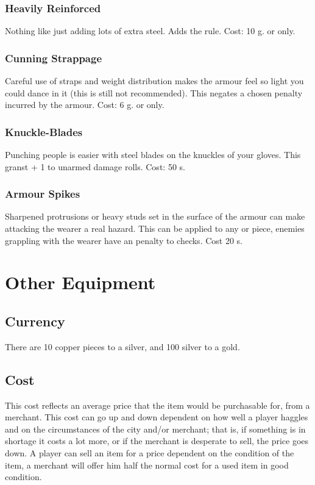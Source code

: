 \subsection{Heavily Reinforced}
Nothing like just adding lots of extra steel. Adds the  rule. Cost: 10 g.  or  only.

\subsection{Cunning Strappage}
Careful use of straps and weight distribution makes the armour feel so light you could dance in it (this is still not recommended). This negates a chosen  penalty incurred by the armour. Cost: 6 g.  or  only.

\subsection{Knuckle-Blades}
Punching people is easier with steel blades on the knuckles of your gloves. This granst + 1  to unarmed damage rolls. Cost: 50 s.

\subsection{Armour Spikes}
Sharpened protrusions or heavy studs set in the surface of the armour can make attacking the wearer a real hazard. This can be applied to any  or  piece, enemies grappling with the wearer have an  penalty to  checks. Cost 20 s.



\chapter{Other Equipment}

\section{Currency}
There are 10 copper pieces to a silver, and 100 silver to a gold.

\section{Cost}
This cost reflects an average price that the item would be purchasable for, from a merchant. This cost can go up and down dependent on how well a player haggles and on the circumstances of the city and/or merchant; that is, if something is in shortage it costs a lot more, or if the merchant is desperate to sell, the price goes down. A player can sell an item for a price dependent on the condition of the item, a merchant will offer him half the normal cost for a used item in good condition.

